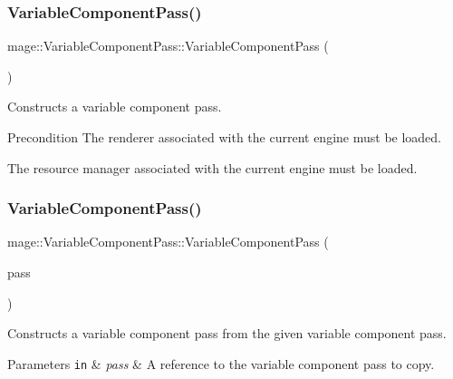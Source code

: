 \subsubsection{\texorpdfstring{Variable\+Component\+Pass()}{VariableComponentPass()}\hspace{0.1cm}{\footnotesize\ttfamily [1/3]}}
{\footnotesize\ttfamily mage\+::\+Variable\+Component\+Pass\+::\+Variable\+Component\+Pass (\begin{DoxyParamCaption}{ }\end{DoxyParamCaption})}

Constructs a variable component pass.

\begin{DoxyPrecond}{Precondition}
The renderer associated with the current engine must be loaded. 

The resource manager associated with the current engine must be loaded. 
\end{DoxyPrecond}
\hypertarget{classmage_1_1_variable_component_pass_aca4507c50e2c05f36ba18801f91e6928}{}\label{classmage_1_1_variable_component_pass_aca4507c50e2c05f36ba18801f91e6928} 
\subsubsection{\texorpdfstring{Variable\+Component\+Pass()}{VariableComponentPass()}\hspace{0.1cm}{\footnotesize\ttfamily [2/3]}}
{\footnotesize\ttfamily mage\+::\+Variable\+Component\+Pass\+::\+Variable\+Component\+Pass (\begin{DoxyParamCaption}\item[{const \hyperlink{classmage_1_1_variable_component_pass}{Variable\+Component\+Pass} \&}]{pass }\end{DoxyParamCaption})\hspace{0.3cm}{\ttfamily [delete]}}

Constructs a variable component pass from the given variable component pass.


\begin{DoxyParams}[1]{Parameters}
\mbox{\tt in}  & {\em pass} & A reference to the variable component pass to copy. \\
\hline
\end{DoxyParams}
\hypertarget{classmage_1_1_variable_component_pass_acda2d913a1beefc3772e5fc70c48c4ab}{}\label{classmage_1_1_variable_component_pass_acda2d913a1beefc3772e5fc70c48c4ab} 
